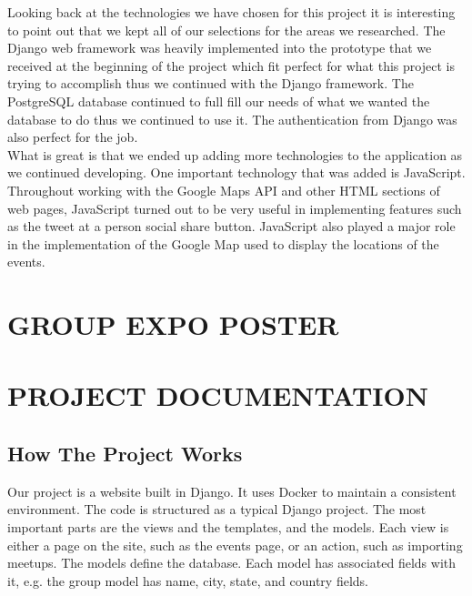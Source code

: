 \documentclass[draftclsnofoot,10pt,onecolumn]{IEEEtran} %
\begin{document}
Looking back at the technologies we have chosen for this project it is interesting to point out that we kept all of our selections 
for the areas we researched. The Django web framework was heavily implemented into the prototype that we received at the 
beginning of the project which fit perfect for what this project is trying to accomplish thus we continued with the Django
framework. The PostgreSQL database continued to full fill our needs of what we wanted the database to do thus we continued 
to use it. The authentication from Django was also perfect for the job. \\

What is great is that we ended up adding more technologies to the application as we continued developing. One important 
technology that was added is JavaScript. Throughout working with the Google Maps API and other HTML sections of web pages, 
JavaScript turned out to be very useful in implementing features such as the tweet at a person social share button. JavaScript 
also played a major role in the implementation of the Google Map used to display the locations of the events. \\

\section{GROUP EXPO POSTER}







\section{PROJECT DOCUMENTATION}

\subsection{How The Project Works}
Our project is a website built in Django. It uses Docker to maintain a
consistent environment. The code is structured as a typical Django project. The
most important parts are the views and the templates, and the models. Each view
is either a page on the site, such as the events page, or an action, such as
importing meetups. The models define the database. Each model has associated
fields with it, e.g. the group model has name, city, state, and country fields.\\
\end{document}
